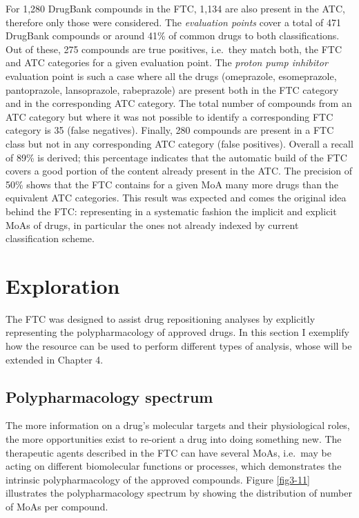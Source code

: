 For 1,280 DrugBank compounds in the FTC, 1,134 are also present in the ATC, therefore only those were considered. The \emph{evaluation points} cover a total of 471 DrugBank compounds or around 41\% of common drugs to both classifications. Out of these, 275 compounds are true positives, i.e.\ they match both, the FTC and ATC categories for a given evaluation point. The \emph{proton pump inhibitor} evaluation point is such a case where all the drugs (omeprazole, esomeprazole, pantoprazole, lansoprazole, rabeprazole) are present both in the FTC category and in the corresponding ATC category. The total number of compounds from an ATC category but where it was not possible to identify a corresponding FTC category is 35 (false negatives). Finally, 280 compounds are present in a FTC class but not in any corresponding ATC category (false positives). Overall a recall of 89\% is derived; this percentage indicates that the automatic build of the FTC covers a good portion of the content already present in the ATC. The precision of 50\% shows that the FTC contains for a given MoA many more drugs than the equivalent ATC categories. This result was expected and comes the original idea behind the FTC: representing in a systematic fashion the implicit and explicit MoAs of drugs, in particular the ones not already indexed by current classification scheme.

\section{Exploration}
The FTC was designed to assist drug repositioning analyses by explicitly representing the polypharmacology of approved drugs. In this section I exemplify how the resource can be used to perform different types of analysis, whose will be extended in Chapter 4.

\subsection{Polypharmacology spectrum}
The more information on a drug's molecular targets and their physiological roles, the more opportunities exist to re-orient a drug into doing something new. The therapeutic agents described in the FTC can have several MoAs, i.e.\ may be acting on different biomolecular functions or processes, which demonstrates the intrinsic polypharmacology of the approved compounds. 
Figure \ref{fig3-11} illustrates the polypharmacology spectrum by showing the distribution of number of MoAs per compound.

